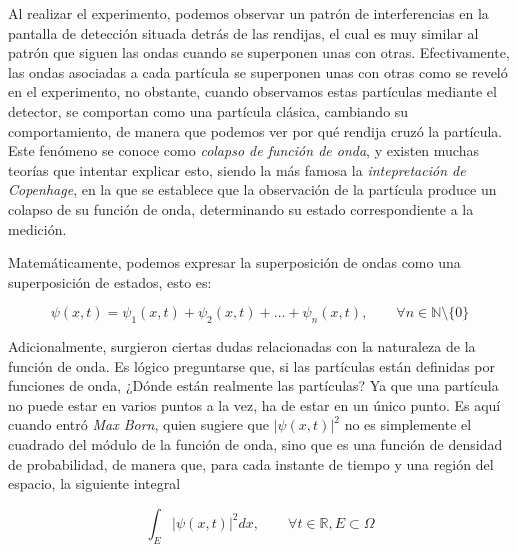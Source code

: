 \documentclass{article}
\numberwithin{equation}{section} %
\begin{document}
        \vspace{5mm}

        Al realizar el experimento, podemos observar un patrón de interferencias en la pantalla de detección situada detrás de las rendijas, el cual es muy similar al patrón que siguen las ondas cuando se superponen unas con otras. Efectivamente, las ondas asociadas a cada partícula se superponen unas con otras como se reveló en el experimento, no obstante, cuando observamos estas partículas mediante el detector, se comportan como una partícula clásica, cambiando su comportamiento, de manera que podemos ver por qué rendija cruzó la partícula. Este fenómeno se conoce como \textit{colapso de función de onda}, y existen muchas teorías que intentar explicar esto, siendo la más famosa la \textit{intepretación de Copenhage}, en la que se establece que la observación de la partícula produce un colapso de su función de onda, determinando su estado correspondiente a la medición.

        \vspace{5mm}

        Matemáticamente, podemos expresar la superposición de ondas como una superposición de estados, esto es:

        \vspace{5mm}

        \begin{equation}
            \psi(x, t) = \psi_{1}(x, t) + \psi_{2}(x, t) + \dots + \psi_{n}(x, t), \qquad \forall n \in \mathbb{N} \setminus \{0\}
            \label{eq: superposicion}
        \end{equation}

        \vspace{5mm}

        Adicionalmente, surgieron ciertas dudas relacionadas con la naturaleza de la función de onda. Es lógico preguntarse que, si las partículas están definidas por funciones de onda, ¿Dónde están realmente las partículas? Ya que una partícula no puede estar en varios puntos a la vez, ha de estar en un único punto. Es aquí cuando entró \textit{Max Born}, quien sugiere que \( \lvert \psi(x, t) \rvert ^ {2} \) no es simplemente el cuadrado del módulo de la función de onda, sino que es una función de densidad de probabilidad, de manera que, para cada instante de tiempo y una región del espacio, la siguiente integral

        \vspace{5mm}

        \begin{equation}
            \int_{E} \lvert \psi(x, t) \rvert ^ {2} dx, \qquad \forall t \in \mathbb{R}, E \subset \Omega
            \label{eq: densidad_probabilidad_onda}
        \end{equation}
\end{document}
